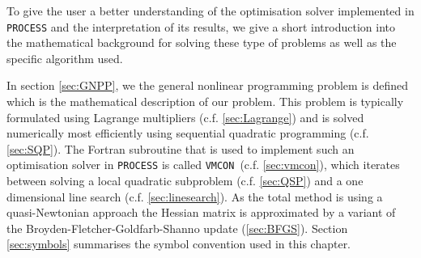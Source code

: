 \documentclass[11pt,a4paper]{report}
\newcommand{\process}{\mbox{\texttt{PROCESS}}}
\newcommand{\vmcon}{\mbox{\texttt{VMCON}}}
\begin{document}
\newcommand{\outerbackground}[5]{%
  \begin{pgfonlayer}{background}
    \path (#1.west |- #2.north)+(-2.0,0.5) node (a1) {};
    \path (#3.east |- #4.south)+(+1.0,-0.5) node (a2) {};
    \path[fill=white!20,rounded corners, draw=black!50, dashed]
      (a1) rectangle (a2);
    \path (a1.east |- a1.south)+(1.3,-0.5) node (u1)[texto]
          { {\bf #5}};
  \end{pgfonlayer}}

\newcommand{\exit}[2]{%
  \path (#1.east)+(+5.0,0.0) node (urtmp)[urred] {\texttt{ifail} = #2};
  \path [line] (#1.east) -- node [above]
    {} (urtmp);}

\newcommand{\exitsucc}[2]{%
  \path (#1.east)+(+5.0,0.0) node (urtmp)[urgreen] {\texttt{ifail} = #2};
  \path [line] (#1.east) -- node [above]
    {} (urtmp);}

\newcommand{\exitleft}[2]{%
  \path (#1.east)+(+7.5,0.0) node (urtmp)[urred] {\texttt{ifail} = #2};
  \path [line] (#1.east) -- node [above]
    {} (urtmp);}

\newcommand{\exitright}[2]{%
  \path (#1.east)+(+2.5,0.0) node (urtmp)[urred] {\texttt{ifail} = #2};
  \path [line] (#1.east) -- node [above]
    {} (urtmp);}

\newcommand{\exitlower}[2]{%
  \path (#1.east)+(+5.,-0.25) node (urtmp)[urred] {\texttt{ifail} = #2};
  \path [line] (#1.east)+(0.0,-0.25) -- node [above]
    {} (urtmp);}

\newcommand{\exithigher}[2]{%
  \path (#1.east)+(+5.,0.25) node (urtmp)[urred] {i\texttt{fail} = #2};
  \path [line] (#1.east)+(0.0,0.25) -- node [above]
    {} (urtmp);}


\label{app:Opt}

To give the user a better understanding of the optimisation solver implemented
in \process\/ and the interpretation of its results, we give a short
introduction into the mathematical background for solving these type of
problems as well as the specific algorithm used.

In section \ref{sec:GNPP}, we the general nonlinear programming problem is
defined which is the mathematical description of our problem. This problem is
typically formulated using Lagrange multipliers (c.f. \ref{sec:Lagrange}) and
is solved numerically most efficiently using sequential quadratic programming
(c.f. \ref{sec:SQP}). The Fortran subroutine that is used to implement such an
optimisation solver in \process\/ is called \vmcon\ (c.f. \ref{sec:vmcon}),
which iterates between solving a local quadratic subproblem
(c.f. \ref{sec:QSP}) and a one dimensional line search
(c.f. \ref{sec:linesearch}). As the total method is using a quasi-Newtonian
approach the Hessian matrix is approximated by a variant of the
Broyden-Fletcher-Goldfarb-Shanno update (\ref{sec:BFGS}). Section
\ref{sec:symbols} summarises the symbol convention used in this chapter.
\end{document}
